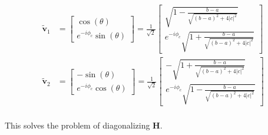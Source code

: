 \documentclass[12pt]{article}
\newcommand{\bv}[1]{\boldsymbol{#1}}
\begin{document}
\begin{align}
\tilde{\bv{v}}_1 &= 
\begin{bmatrix}
\cos(\theta)\\e^{-i\phi_c}\sin(\theta)
\end{bmatrix}
=
\frac{1}{\sqrt{2}}\begin{bmatrix}
\sqrt{1-\frac{b-a}{\sqrt{(b-a)^2+4|c|^2}}}\\e^{-i\phi_c}\sqrt{1+\frac{b-a}{\sqrt{(b-a)^2+4|c|^2}}}
\end{bmatrix}\\
\tilde{\bv{v}}_2 &= 
\begin{bmatrix}
-\sin(\theta)\\e^{-i\phi_c}\cos(\theta)
\end{bmatrix}
=
\frac{1}{\sqrt{2}}\begin{bmatrix}
-\sqrt{1+\frac{b-a}{\sqrt{(b-a)^2+4|c|^2}}}\\e^{-i\phi_c}\sqrt{1-\frac{b-a}{\sqrt{(b-a)^2+4|c|^2}}}
\end{bmatrix}\\
\end{align}

This solves the problem of diagonalizing $\bv{H}$.
\end{document}
